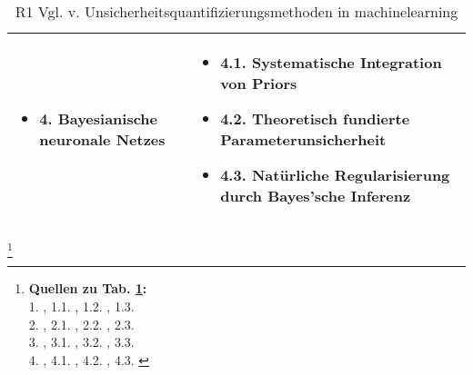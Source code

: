\begin{otherlanguage}{ngerman}
\begin{table}[!htpb]
\begin{tabularx}{\textwidth}{|l|X|}
    \begin{itemize}[topsep=0em, itemsep=0em, leftmargin=0em, labelsep=0.25em]
      \item 4. \gls{Bayesianische neuronale Netze}s
    \end{itemize} & 
    \begin{itemize}[topsep=0em, itemsep=0em, leftmargin=0em, labelsep=0.25em]
      \item 4.1. Systematische Integration von Priors
      \item 4.2. Theoretisch fundierte Parameterunsicherheit
      \item 4.3. Natürliche Regularisierung durch Bayes'sche Inferenz
    \end{itemize} \\
    \hline
  \end{tabularx}
  \caption{R1 Vgl. v. Unsicherheitsquantifizierungsmethoden in \gls{machinelearning}}
  \label{tab:chapter6r1}
\end{table}

\footnote{%
\begin{minipage}[t]{\textwidth}
\scriptsize
\textbf{Quellen zu Tab. \ref{tab:chapter6r1}:}\\
1. \parencite[Kap.~2]{rasmussen2006gaussian}, 
1.1. \parencite[S.~16–17]{rasmussen2006gaussian}, 
1.2. \parencite[Kap.~2.2]{rasmussen2006gaussian},
1.3. \parencite[Kap.~4]{rasmussen2006gaussian}\\[0.3em]
2. \parencite{lakshminarayanan2017simple},
2.1. \parencite[S.~3]{lakshminarayanan2017simple},
2.2. \parencite[S.~5]{lakshminarayanan2017simple},
2.3. \parencite{ovadia2019can}\\[0.3em]
3. \parencite{perdikaris2017nonlinear}, 
3.1. \parencite[S.~5–6]{perdikaris2017nonlinear},
3.2. \parencite[S.~6]{perdikaris2017nonlinear},
3.3. \parencite{liu2020multifidelity}\\[0.3em]
4. \parencite{gal2016uncertainty}, 
4.1. \parencite[Kap.~2.3]{gal2016uncertainty}, 
4.2. \parencite[S.~40–41]{gal2016uncertainty}, 
4.3. \parencite[S.~41–42]{gal2016uncertainty}
\end{minipage}%
}


\newpage



\end{otherlanguage}
